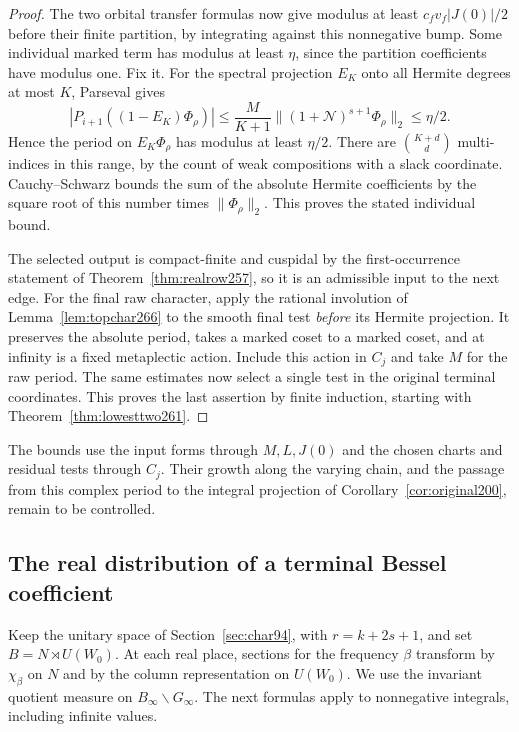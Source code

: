 \documentclass[a4paper,11pt]{article}
\theoremstyle{definition}
\theoremstyle{remark}
\numberwithin{equation}{section}
\begin{document}
\begin{proof}
The two orbital transfer formulas now give modulus at least
\(c_fv_f|J(0)|/2\) before their finite partition, by
integrating against this nonnegative bump. Some individual
marked term has modulus at least \(\eta\), since the partition
coefficients have modulus one. Fix it. For the spectral
projection \(E_K\) onto all Hermite degrees at most \(K\),
Parseval gives
\[
 |P_{i+1}((1-E_K)\Phi_\rho)|
 \le \frac{M}{K+1}\|(1+\mathcal N)^{s+1}\Phi_\rho\|_2
 \le\eta/2 .
\]
Hence the period on \(E_K\Phi_\rho\) has modulus at least
\(\eta/2\). There are \(\binom{K+d}{d}\) multi-indices in
this range, by the count of weak compositions with a slack
coordinate. Cauchy--Schwarz bounds the sum of the absolute
Hermite coefficients by the square root of this number times
\(\|\Phi_\rho\|_2\). This proves the stated individual bound.

The selected output is compact-finite and cuspidal by the
first-occurrence statement of Theorem~\ref{thm:realrow257},
so it is an admissible input to the next edge. For the final
raw character, apply the rational involution of
Lemma~\ref{lem:topchar266} to the smooth final test
\emph{before} its Hermite projection. It preserves the absolute
period, takes a marked coset to a marked coset, and at infinity
is a fixed metaplectic action. Include this action in \(C_j\)
and take \(M\) for the raw period. The same estimates now
select a single test in the original terminal coordinates.
This proves the last assertion by finite induction, starting
with Theorem~\ref{thm:lowesttwo261}.
\end{proof}

The bounds use the input forms through \(M,L,J(0)\) and the
chosen charts and residual tests through \(C_j\). Their growth
along the varying chain, and the passage from this complex
period to the integral projection of
Corollary~\ref{cor:original200}, remain to be controlled.

\subsection{The real distribution of a terminal Bessel coefficient}\label{nav:VII-05}
\label{sec:terminal151}

Keep the unitary space of Section~\ref{sec:char94}, with
\(r=k+2s+1\), and set \(B=N\rtimes U(W_0)\). At each real
place, sections for the frequency \(\beta\) transform by
\(\chi_\beta\) on \(N\) and by the column representation on
\(U(W_0)\). We use the invariant quotient measure on
\(B_\infty\backslash G_\infty\). The next formulas apply to
nonnegative integrals, including infinite values.
\end{document}
